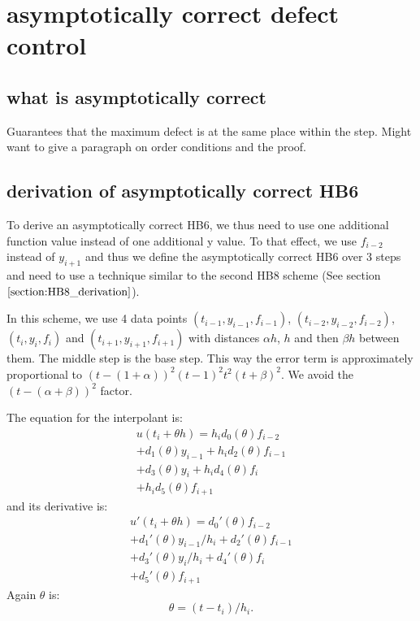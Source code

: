 \section{asymptotically correct defect control}
\subsection{what is asymptotically correct}
Guarantees that the maximum defect is at the same place within the step.
Might want to give a paragraph on order conditions and the proof.

\subsection{derivation of asymptotically correct HB6}
To derive an asymptotically correct HB6, we thus need to use one additional function value instead of one additional y value. To that effect, we use $f_{i-2}$ instead of $y_{i+1}$ and thus we define the asymptotically correct HB6 over 3 steps and need to use a technique similar to the second HB8 scheme (See section $\ref{section:HB8_derivation}$).

In this scheme, we use 4 data points $(t_{i-1}, y_{i-1}, f_{i-1})$, $(t_{i-2}, y_{i-2}, f_{i-2})$, $(t_{i}, y_{i}, f_{i})$ and $(t_{i+1}, y_{i+1}, f_{i+1})$ with distances $\alpha h$, $h$ and then $\beta h$ between them. The middle step is the base step. This way the error term is approximately proportional to $(t- (1+\alpha))^2(t-1)^2t^2(t+\beta)^2$. We avoid the $(t-(\alpha+\beta))^2$ factor. 

The equation for the interpolant is:
\begin{equation}
\begin{split}
u(t_i + \theta h) = 
 h_id_0(\theta)f_{i-2} \\
 + d_1(\theta)y_{i-1} 
 + h_id_2(\theta)f_{i-1}\\
 + d_3(\theta)y_i 
 + h_id_4(\theta)f_i \\
 + h_id_5(\theta)f_{i+1}
\end{split}
\end{equation}
and its derivative is:
\begin{equation}
\begin{split}
u'(t_i + \theta h) = 
 d_0'(\theta)f_{i-2}\\
 + d_1'(\theta)y_{i-1}/h_i 
 + d_2'(\theta)f_{i-1}\\
 + d_3'(\theta)y_i/h_i
 + d_4'(\theta)f_i \\
 + d_5'(\theta)f_{i+1}
\end{split}
\end{equation}
Again $\theta$ is:
\begin{equation}
\theta = (t - t_i) / h_i.
\end{equation}

